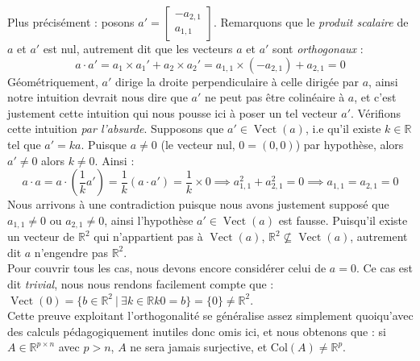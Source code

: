 \documentclass{article}
\newcommand{\R}{\mathbb{R}}
\newcommand{\cross}{\times}
\newcommand{\Col}{\text{Col}}
\DeclareMathOperator{\Vect}{Vect}
\begin{document}
Plus précisément : posons $a' = \begin{bmatrix}
-a_{2,1} \\
a_{1,1}
\end{bmatrix}$. Remarquons que le \textit{produit scalaire} de $a$ et $a'$ est nul, autrement dit que les vecteurs $a$ et $a'$ sont \textit{orthogonaux} : $$a \cdot a' = a_1 \times a_1' + a_2 \times a_2' = a_{1,1}\times (-a_{2,1}) + a_{2,1} = 0$$
Géométriquement, $a'$ dirige la droite perpendiculaire à celle dirigée par $a$, ainsi notre intuition devrait nous dire que $a'$ ne peut pas être colinéaire à $a$, et c'est justement cette intuition qui nous pousse ici à poser un tel vecteur $a'$. Vérifions cette intuition \textit{par l'absurde}. Supposons que $a' \in \Vect(a)$, i.e qu'il existe $k \in \R$ tel que $a' = ka$. Puisque $a \neq 0$ (le vecteur nul, $0 = (0,0)$) par hypothèse, alors $a' \neq 0$ alors $k \neq 0$. Ainsi : $$a \cdot a = a \cdot \left(\frac{1}{k}a'\right) = \frac{1}{k}(a \cdot a') = \frac{1}{k} \times 0 \implies a_{1,1}^2 + a_{2,1}^2 = 0 \implies a_{1,1} = a_{2,1} = 0$$
\noindent Nous arrivons à une contradiction puisque nous avons justement supposé que $a_{1,1} \neq 0$ ou $a_{2,1} \neq 0$, ainsi l'hypothèse $a' \in \Vect(a)$ est fausse. Puisqu'il existe un vecteur de $\R^2$ qui n'appartient pas à $\Vect(a)$, $\R^2 \not \subseteq \Vect(a)$, autrement dit $a$ n'engendre pas $\R^2$. \\

\noindent Pour couvrir tous les cas, nous devons encore considérer celui de $a = 0$. Ce cas est dit \textit{trivial}, nous nous rendons facilement compte que : $\Vect(0) = \{b \in \R^2 \ | \ \exists k \in \R k0 = b\} = \{0\} \neq  \R^2$.\\ 

\noindent Cette preuve exploitant l'orthogonalité se généralise assez simplement quoiqu'avec des calculs pédagogiquement inutiles donc omis ici, et nous obtenons que : si $A \in \R^{p \cross n}$ avec $p > n$, $A$ ne sera jamais surjective, et $\Col(A) \neq \R^p$. \\
\end{document}
